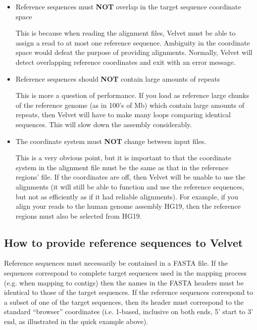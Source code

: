 \documentclass[12pt]{article}
\begin{document}
\begin{itemize}
\item Reference sequences must \textbf{NOT} overlap in the target sequence coordinate space

This is because when reading the alignment files, Velvet must be able to assign a read to at most one reference sequence. Ambiguity in the coordinate space would defeat the purpose of providing alignments. Normally, Velvet will detect overlapping reference coordinates and exit with an error message.

\item Reference sequences should \textbf{NOT} contain large amounts of repeats

This is more a question of performance. If you load as reference large chunks of the reference genome (as in 100's of Mb) which contain large amounts of repeats, then Velvet will have to make many loops comparing identical sequences. This will slow down the assembly considerably.

\item The coordinate system must \textbf{NOT} change between input files.

This is a very obvious point, but it is important to that the coordinate system in the alignment file must be the same as that in the reference regions' file. If the coordinates are off, then Velvet will be unable to use the alignments (it will still be able to function and use the reference sequences, but not as efficiently as if it had reliable alignments). For example, if you align your reads to the human genome assembly HG19, then the reference regions must also be selected from HG19.

\end{itemize}

\subsection{How to provide reference sequences to Velvet}

Reference sequences must necessarily be contained in a FASTA file. If the sequences correspond to complete target sequences used in the mapping
process (e.g. when mapping to contigs) then the names in the FASTA headers must be identical to those of the target sequences. If the reference
sequences correspond to a subset of one of the target sequences, then its header must correspond to the standard ``browser'' coordinates (i.e.
1-based, inclusive on both ends, 5' start to 3' end, as illustrated in the quick example above).
\end{document}
